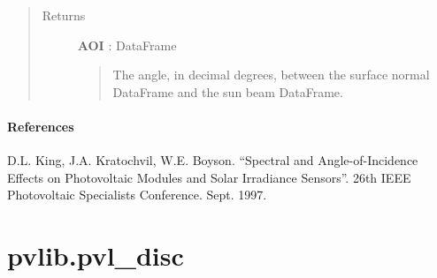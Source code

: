 \documentclass[letterpaper,10pt,english]{sphinxmanual}
\begin{document}
\begin{fulllineitems}
\begin{quote}
\begin{description}
\item[{Returns}] \leavevmode
\textbf{AOI} : DataFrame
\begin{quote}

The angle, in decimal degrees, between the surface normal DataFrame and the sun beam DataFrame.
\end{quote}

\end{description}\end{quote}






\paragraph{References}

D.L. King, J.A. Kratochvil, W.E. Boyson. ``Spectral and
Angle-of-Incidence Effects on Photovoltaic Modules and Solar Irradiance
Sensors''. 26th IEEE Photovoltaic Specialists Conference. Sept. 1997.

\end{fulllineitems}



\section{pvlib.pvl\_disc}
\label{stubs/pvlib.pvl_disc::doc}\label{stubs/pvlib.pvl_disc:pvlib-pvl-disc}
\end{document}
